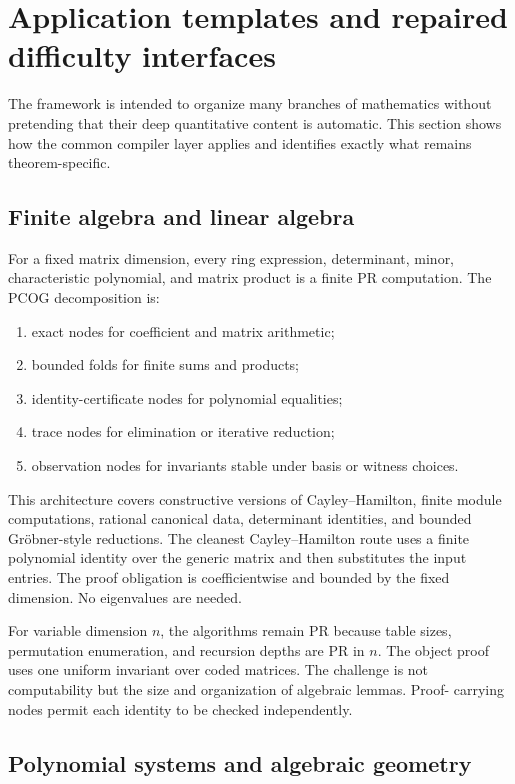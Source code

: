 \section{Application templates and repaired difficulty interfaces}
\label{sec:applications}

The framework is intended to organize many branches of mathematics without
pretending that their deep quantitative content is automatic.  This section
shows how the common compiler layer applies and identifies exactly what remains
theorem-specific.

\subsection{Finite algebra and linear algebra}

For a fixed matrix dimension, every ring expression, determinant, minor,
characteristic polynomial, and matrix product is a finite PR computation.
The PCOG decomposition is:

\begin{enumerate}
\item exact nodes for coefficient and matrix arithmetic;
\item bounded folds for finite sums and products;
\item identity-certificate nodes for polynomial equalities;
\item trace nodes for elimination or iterative reduction;
\item observation nodes for invariants stable under basis or witness choices.
\end{enumerate}

This architecture covers constructive versions of Cayley--Hamilton, finite
module computations, rational canonical data, determinant identities, and
bounded Gröbner-style reductions.  The cleanest Cayley--Hamilton route uses a
finite polynomial identity over the generic matrix and then substitutes the
input entries.  The proof obligation is coefficientwise and bounded by the
fixed dimension.  No eigenvalues are needed.

For variable dimension \(n\), the algorithms remain PR because table sizes,
permutation enumeration, and recursion depths are PR in \(n\).  The object
proof uses one uniform invariant over coded matrices.  The challenge is not
computability but the size and organization of algebraic lemmas.  Proof-
carrying nodes permit each identity to be checked independently.

\subsection{Polynomial systems and algebraic geometry}

